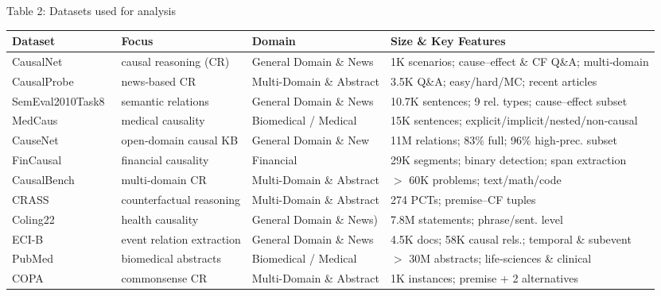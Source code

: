 \documentclass[conference]{IEEEtran}
\begin{document}
\begin{table}[t]
\centering
\scriptsize
Table 2: {Datasets used for analysis}
\renewcommand{\arraystretch}{1.1}
\begin{tabular}{@{}p{} p{} p{} p{}@{}}
\toprule
\textbf{Dataset} & \textbf{Focus} & \textbf{Domain} & \textbf{Size \& Key Features} \\
\midrule
CausalNet~\cite{ashwani2024cause}                   & causal reasoning (CR) & General Domain \& News           & 1K scenarios; cause–effect \& CF Q\&A; multi‐domain \\
CausalProbe~\cite{chi2024unveiling}            & news‐based CR & Multi-Domain \& Abstract & 3.5K Q\&A; easy/hard/MC; recent articles \\
SemEval2010Task8~\cite{hendrickx-etal-2010-semeval} & semantic relations         & General Domain \& News & 10.7K sentences; 9 rel. types; cause–effect subset \\
MedCaus~\cite{moghimifar-etal-2020-domain}          & medical causality          & Biomedical / Medical & 15K sentences; explicit/implicit/nested/non‑causal \\
CauseNet~\cite{10.1145/3340531.3412763}               & open‑domain causal KB       & General Domain \& New & 11M relations; 83\% full; 96\% high‑prec. subset \\
FinCausal~\cite{mariko-etal-2020-financial}         & financial causality         & Financial & 29K segments; binary detection; span extraction \\
CausalBench~\cite{wang-2024-causalbench}            & multi‑domain CR & Multi-Domain \& Abstract & $>$ 60K problems; text/math/code \\
CRASS~\cite{frohberg-binder-2022-crass}             & counterfactual reasoning    & Multi-Domain \& Abstract & 274 PCTs; premise–CF tuples \\
Coling22~\cite{schlatt-etal-2022-mining} & health causality     & General Domain \& News)  & 7.8M statements; phrase/sent. level \\
ECI-B~\cite{wang-chen-etal2022MAVENERE}         & event relation extraction    & General Domain \& News & 4.5K docs; 58K causal rels.; temporal \& subevent \\
PubMed~\cite{white2020pubmed}                                & biomedical abstracts     & Biomedical / Medical     & $>$ 30M abstracts; life‑sciences \& clinical \\
COPA~\cite{roemmele2011choice}                      & commonsense CR & Multi-Domain \& Abstract & 1K instances; premise + 2 alternatives \\
\bottomrule
\end{tabular}
\label{tab:datasets}
\end{table}
\end{document}
